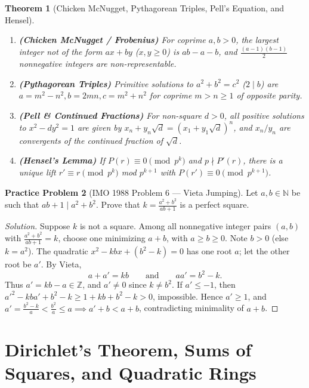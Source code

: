 \documentclass[11pt]{article}
\theoremstyle{plain}
\newtheorem{theorem}{Theorem}[section]
\theoremstyle{definition}
\newtheorem{problem}[theorem]{Practice Problem}
\newenvironment{solution}{\begin{proof}[Solution]}{\end{proof}}
\newcommand{\ZZ}{\mathbb{Z}}
\newcommand{\NN}{\mathbb{N}}
\begin{document}
\begin{theorem}[Chicken McNugget, Pythagorean Triples, Pell's Equation, and Hensel]
\leavevmode
\begin{enumerate}[label=(\alph*)]
\item \textbf{(Chicken McNugget / Frobenius)} For coprime $a, b > 0$, the largest integer not of the form $ax + by$ ($x,y \ge 0$) is $ab - a - b$, and $\frac{(a-1)(b-1)}{2}$ nonnegative integers are non-representable.
\item \textbf{(Pythagorean Triples)} Primitive solutions to $a^2+b^2=c^2$ ($2\mid b$) are $a=m^2-n^2, b=2mn, c=m^2+n^2$ for coprime $m>n\ge 1$ of opposite parity.
\item \textbf{(Pell \& Continued Fractions)} For non-square $d > 0$, all positive solutions to $x^2 - dy^2 = 1$ are given by $x_n + y_n\sqrt{d} = (x_1 + y_1\sqrt{d})^n$, and $x_n/y_n$ are convergents of the continued fraction of $\sqrt{d}$.
\item \textbf{(Hensel's Lemma)} If $P(r) \equiv 0 \pmod{p^k}$ and $p \nmid P'(r)$, there is a unique lift $r' \equiv r \pmod{p^k}$ mod $p^{k+1}$ with $P(r') \equiv 0 \pmod{p^{k+1}}$.
\end{enumerate}
\end{theorem}

\begin{problem}[IMO 1988 Problem 6 --- Vieta Jumping]
Let $a, b \in \NN$ be such that $ab + 1 \mid a^2 + b^2$. Prove that $k = \frac{a^2 + b^2}{ab + 1}$ is a perfect square.
\end{problem}
\begin{solution}
Suppose $k$ is not a square. Among all nonnegative integer pairs $(a,b)$ with $\frac{a^2+b^2}{ab+1} = k$, choose one minimizing $a + b$, with $a \ge b \ge 0$. Note $b > 0$ (else $k = a^2$). The quadratic $x^2 - kbx + (b^2 - k) = 0$ has one root $a$; let the other root be $a'$. By Vieta,
\[
a + a' = kb \qquad\text{and}\qquad a a' = b^2 - k.
\]
Thus $a' = kb - a \in \ZZ$, and $a' \ne 0$ since $k \ne b^2$. If $a' \le -1$, then $a'^2 - kba' + b^2 - k \ge 1 + kb + b^2 - k > 0$, impossible. Hence $a' \ge 1$, and $a' = \frac{b^2-k}{a} < \frac{b^2}{a} \le a \implies a' + b < a + b$, contradicting minimality of $a+b$.
\end{solution}

\section{Dirichlet's Theorem, Sums of Squares, and Quadratic Rings}
\end{document}
